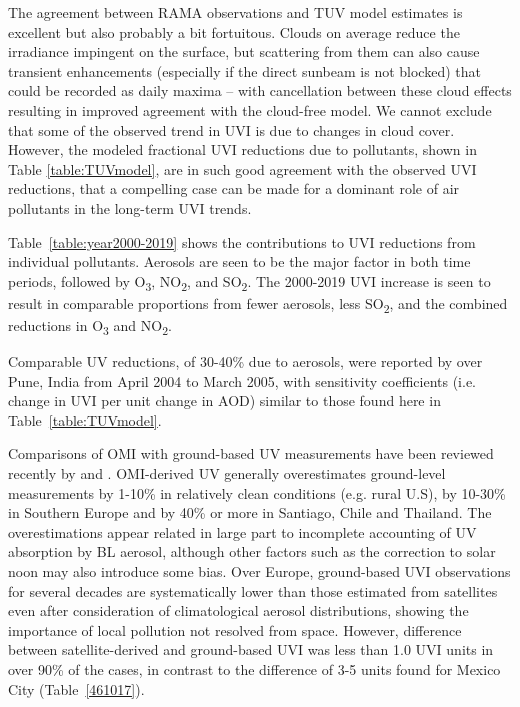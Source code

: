\documentclass[journal=jacsat,manuscript=article]{achemso}
\begin{document}
The agreement between RAMA observations and TUV model estimates is
excellent but also probably a bit fortuitous. Clouds on average reduce
the irradiance impingent on the surface, but scattering from them can
also cause transient enhancements (especially if the direct sunbeam is
not blocked) that could be recorded as daily maxima -- with cancellation
between these cloud effects resulting in improved agreement with the
cloud-free model. We cannot exclude that some of the observed trend in
UVI is due to changes in cloud cover. However, the modeled fractional
UVI reductions due to pollutants, shown in Table
  {\ref{table:TUVmodel}}, are in such good agreement with
the observed UVI reductions, that a compelling case can be made for a
dominant role of air pollutants in the long-term UVI trends.

Table~{\ref{table:year2000-2019}} shows the
contributions to UVI reductions from individual pollutants. Aerosols are
seen to be the major factor in both time periods, followed by
O\textsubscript{3}, NO\textsubscript{2}, and SO\textsubscript{2}. The
2000-2019 UVI increase is seen to result in comparable proportions from
fewer aerosols, less SO\textsubscript{2}, and the combined reductions in
O\textsubscript{3} and NO\textsubscript{2}.

Comparable UV reductions, of 30-40\% due to aerosols, were reported by
\citet{Panicker_2009} over Pune, India from April 2004 to
March 2005, with sensitivity coefficients (i.e. change in UVI per unit
change in AOD) similar to those found here in Table~\ref{table:TUVmodel}.

Comparisons of OMI with ground-based UV measurements have been reviewed
recently by \citet{Zhang_2019} and \citet{Vitt_2020}.
OMI-derived UV generally overestimates
ground-level measurements by 1-10\% in relatively clean conditions (e.g.
rural U.S), by 10-30\% in Southern Europe and by 40\% or more in
Santiago, Chile\citep{Cabrera_2012} and Thailand\citep{Janjai_2013}. The
overestimations appear related in large part to incomplete accounting of
UV absorption by BL aerosol, although other factors such as the
correction to solar noon may also introduce some
bias.\citep{Zhang_2019} Over Europe, ground-based UVI observations for
several decades are systematically lower than those estimated from
satellites even after consideration of climatological aerosol
distributions, showing the importance of local pollution not resolved
from space.\citep{Vitt_2020} However, difference between
satellite-derived and ground-based UVI was less than 1.0 UVI units in
over 90\% of the cases, in contrast to the difference of 3-5 units found
for Mexico City (Table~{\ref{461017}}).
\end{document}
